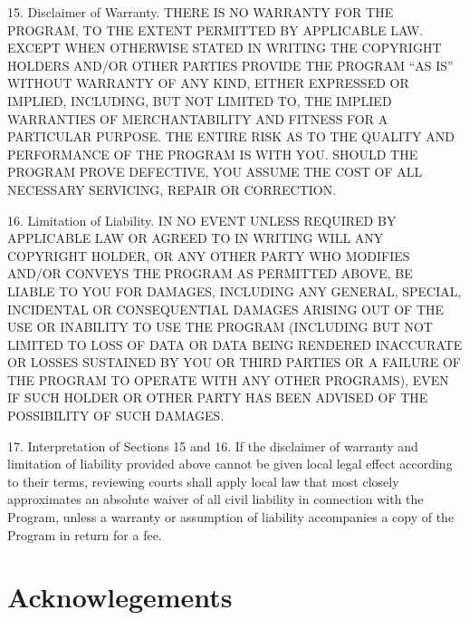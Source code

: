 \documentclass {book}
\begin{document}
\begin{tiny}
15. Disclaimer of Warranty. THERE IS NO WARRANTY FOR THE PROGRAM, TO THE EXTENT PERMITTED BY APPLICABLE LAW. EXCEPT WHEN OTHERWISE STATED IN WRITING THE COPYRIGHT HOLDERS AND/OR OTHER PARTIES PROVIDE THE PROGRAM ``AS IS'' WITHOUT WARRANTY OF ANY KIND, EITHER EXPRESSED OR IMPLIED, INCLUDING, BUT NOT LIMITED TO, THE IMPLIED WARRANTIES OF MERCHANTABILITY AND FITNESS FOR A PARTICULAR PURPOSE. THE ENTIRE RISK AS TO THE QUALITY AND PERFORMANCE OF THE PROGRAM IS WITH YOU. SHOULD THE PROGRAM PROVE DEFECTIVE, YOU ASSUME THE COST OF ALL NECESSARY SERVICING, REPAIR OR CORRECTION.

16. Limitation of Liability. IN NO EVENT UNLESS REQUIRED BY APPLICABLE LAW OR AGREED TO IN WRITING WILL ANY COPYRIGHT HOLDER, OR ANY OTHER PARTY WHO MODIFIES AND/OR CONVEYS THE PROGRAM AS PERMITTED ABOVE, BE LIABLE TO YOU FOR DAMAGES, INCLUDING ANY GENERAL, SPECIAL, INCIDENTAL OR CONSEQUENTIAL DAMAGES ARISING OUT OF THE USE OR INABILITY TO USE THE PROGRAM (INCLUDING BUT NOT LIMITED TO LOSS OF DATA OR DATA BEING RENDERED INACCURATE OR LOSSES SUSTAINED BY YOU OR THIRD PARTIES OR A FAILURE OF THE PROGRAM TO OPERATE WITH ANY OTHER PROGRAMS), EVEN IF SUCH HOLDER OR OTHER PARTY HAS BEEN ADVISED OF THE POSSIBILITY OF SUCH DAMAGES.

17. Interpretation of Sections 15 and 16. If the disclaimer of warranty and limitation of liability provided above cannot be given local legal effect according to their terms, reviewing courts shall apply local law that most closely approximates an absolute waiver of all civil liability in connection with the Program, unless a warranty or assumption of liability accompanies a copy of the Program in return for a fee.

\end{tiny}


\chapter{Acknowlegements}
\end{document}
